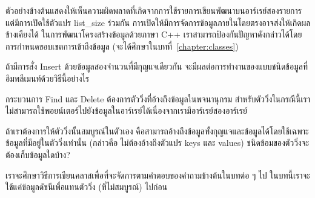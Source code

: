 ตัวอย่าง{\wbr}ข้างต้น{\wbr}แสดง{\wbr}ให้{\wbr}เห็น{\wbr}ความผิด{\wbr}พลาด{\wbr}ที่{\wbr}เกิด{\wbr}จาก{\wbr}การ{\wbr}ใช้{\wbr}รายการ{\wbr}เขียน{\wbr}พัฒนา{\wbr}บน{\wbr}อาร์เรย์{\wbr}สอง{\wbr}รายการ{\wbr}
แต่{\wbr}มี{\wbr}การ{\wbr}เปิด{\wbr}ใช้{\wbr}ตัวแปร {\ct list\_size} ร่วม{\wbr}กัน{\wbr}
การ{\wbr}เปิด{\wbr}ให้{\wbr}มี{\wbr}การ{\wbr}จัดการ{\wbr}ข้อมูล{\wbr}ภายใน{\wbr}โดย{\wbr}ตรง{\wbr}อาจ{\wbr}ส่ง{\wbr}ให้{\wbr}เกิด{\wbr}ผลข้างเคียง{\wbr}ได้{\wbr}
ใน{\wbr}การ{\wbr}พัฒนา{\wbr}โครงสร้าง{\wbr}ข้อมูล{\wbr}ด้วย{\wbr}ภาษา C++
เรา{\wbr}สามารถ{\wbr}ป้องกัน{\wbr}ปัญหา{\wbr}ดังกล่าว{\wbr}ได้{\wbr}โดย{\wbr}การ{\wbr}กำหนด{\wbr}ขอบเขต{\wbr}การ{\wbr}เข้าถึง{\wbr}ข้อมูล{\wbr}
(จะ{\wbr}ได้{\wbr}ศึกษา{\wbr}ใน{\wbr}บท{\wbr}ที่~\ref{chapter:classes})

\begin{quiz}{}
ถ้า{\wbr}มี{\wbr}การ{\wbr}สั่ง Insert ด้วย{\wbr}ข้อมูล{\wbr}สอง{\wbr}จำนวน{\wbr}ที่{\wbr}มี{\wbr}กุญแจ{\wbr}เดียวกัน{\wbr}
จะ{\wbr}มี{\wbr}ผล{\wbr}ต่อ{\wbr}การ{\wbr}ทำงาน{\wbr}ของ{\wbr}แบบ{\wbr}ชนิด{\wbr}ข้อมูล{\wbr}ที่{\wbr}อิม{\wbr}พลี{\wbr}เมนท์{\wbr}ด้วย{\wbr}วิธี{\wbr}นี้{\wbr}อย่างไร{\wbr}
\end{quiz}

กระบวนการ Find และ Delete ต้องการ{\wbr}ตัว{\wbr}วิ่ง{\wbr}ที่{\wbr}อ้าง{\wbr}ถึง{\wbr}ข้อมูล{\wbr}ใน{\wbr}พจนานุกรม{\wbr}
สำหรับ{\wbr}ตัว{\wbr}วิ่ง{\wbr}ใน{\wbr}กรณี{\wbr}นี้{\wbr}เรา{\wbr}ไม่{\wbr}สามารถ{\wbr}ใช้{\wbr}พอยน์เตอร์{\wbr}ไป{\wbr}ยัง{\wbr}ข้อมูล{\wbr}ใน{\wbr}อาร์เรย์{\wbr}ได้{\wbr}เนื่องจาก{\wbr}เรา{\wbr}มี{\wbr}อาร์เรย์{\wbr}สอง{\wbr}อาร์เรย์

\begin{quiz}{}
ถ้า{\wbr}เรา{\wbr}ต้องการ{\wbr}ให้{\wbr}ตัว{\wbr}วิ่ง{\wbr}นั้น{\wbr}สมบูรณ์{\wbr}ใน{\wbr}ตัวเอง{\wbr}
คือ{\wbr}สามารถ{\wbr}อ้าง{\wbr}ถึง{\wbr}ข้อมูล{\wbr}ทั้ง{\wbr}กุญแจ{\wbr}และ{\wbr}ข้อมูล{\wbr}ได้{\wbr}โดย{\wbr}ใช้{\wbr}เฉพาะ{\wbr}ข้อมูล{\wbr}ที่{\wbr}มี{\wbr}อยู่{\wbr}ใน{\wbr}ตัว{\wbr}วิ่ง{\wbr}เท่านั้น (กล่าวคือ{\wbr}
ไม่{\wbr}ต้อง{\wbr}อ้าง{\wbr}ถึง{\wbr}ตัวแปร {\ct keys} และ {\ct values})
ชนิด{\wbr}ข้อ{\wbr}ม{\wbr}ของ{\wbr}ตัว{\wbr}วิ่ง{\wbr}จะ{\wbr}ต้อง{\wbr}เก็บ{\wbr}ข้อมูล{\wbr}ใด{\wbr}บ้าง?
\end{quiz}

เรา{\wbr}จะ{\wbr}ศึกษา{\wbr}วิธีการ{\wbr}เขียน{\wbr}ค{\wbr}ลา{\wbr}ส{\wbr}เพื่อที่จะ{\wbr}จัดการ{\wbr}ตาม{\wbr}คำตอบ{\wbr}ของ{\wbr}คำถาม{\wbr}ข้างต้น{\wbr}ใน{\wbr}บท{\wbr}ต่อ ๆ ไป{\wbr}
ใน{\wbr}บท{\wbr}นี้{\wbr}เรา{\wbr}จะ{\wbr}ใช้{\wbr}แค่{\wbr}ข้อมูล{\wbr}ดัชนี{\wbr}เพื่อ{\wbr}แทน{\wbr}ตัว{\wbr}วิ่ง (ที่{\wbr}ไม่{\wbr}สมบูรณ์) ไป{\wbr}ก่อน{\wbr}

